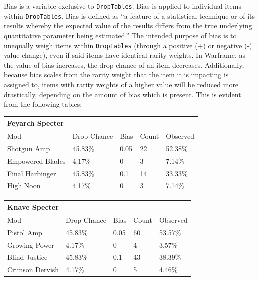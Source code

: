 \documentclass[12pt]{article}
\begin{document}
Bias is a variable exclusive to \texttt{DropTables}. Bias is applied to individual items within \texttt{DropTables}. Bias is defined as “a feature of a statistical technique or of its results whereby the expected value of the results differs from the true underlying quantitative parameter being estimated.” The intended purpose of bias is to unequally weigh items within \texttt{DropTables} (through a positive (+) or negative (-) value change), even if said items have identical rarity weights. In Warframe, as the value of bias increases, the drop chance of an item decreases. Additionally, because bias scales from the rarity weight that the item it is impacting is assigned to, items with rarity weights of a higher value will be reduced more drastically, depending on the amount of bias which is present. This is evident from the following tables:

\begin{center}
	\begin{tabular}{|l||l|l|l||l|}
		\hline
		Feyarch Specter \\
		\hline
		Mod              & Drop Chance & Bias & Count & Observed \\
		\hline
		Shotgun Amp      & 45.83\%     & 0.05 & 22    & 52.38\%  \\
		Empowered Blades & 4.17\%      & 0    & 3     & 7.14\%   \\
		Final Harbinger  & 45.83\%     & 0.1  & 14    & 33.33\%  \\
		High Noon        & 4.17\%      & 0    & 3     & 7.14\%   \\ 
		\hline
	\end{tabular}
\end{center}

\begin{center}
	\begin{tabular}{|l||l|l|l||l|}
		\hline
		Knave Specter \\
		\hline
		Mod             & Drop Chance & Bias & Count & Observed \\
		\hline
		Pistol Amp      & 45.83\%     & 0.05 & 60    & 53.57\%  \\
		Growing Power   & 4.17\%      & 0    & 4     & 3.57\%   \\
		Blind Justice   & 45.83\%     & 0.1  & 43    & 38.39\%  \\
		Crimson Dervish & 4.17\%      & 0    & 5     & 4.46\%   \\ 
		\hline
	\end{tabular}
\end{center}
\end{document}
